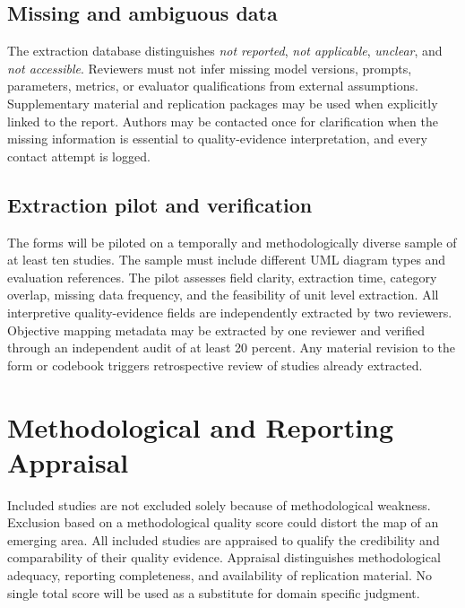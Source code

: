 \subsection{Missing and ambiguous data}

The extraction database distinguishes \textit{not reported}, \textit{not applicable}, \textit{unclear}, and \textit{not accessible}. Reviewers must not infer missing model versions, prompts, parameters, metrics, or evaluator qualifications from external assumptions. Supplementary material and replication packages may be used when explicitly linked to the report. Authors may be contacted once for clarification when the missing information is essential to quality-evidence interpretation, and every contact attempt is logged.

\subsection{Extraction pilot and verification}

The forms will be piloted on a temporally and methodologically diverse sample of at least ten studies. The sample must include different UML diagram types and evaluation references. The pilot assesses field clarity, extraction time, category overlap, missing data frequency, and the feasibility of unit level extraction. All interpretive quality-evidence fields are independently extracted by two reviewers. Objective mapping metadata may be extracted by one reviewer and verified through an independent audit of at least 20 percent. Any material revision to the form or codebook triggers retrospective review of studies already extracted.

\section{Methodological and Reporting Appraisal}
\label{sec:protocol_appraisal}

Included studies are not excluded solely because of methodological weakness. Exclusion based on a methodological quality score could distort the map of an emerging area. All included studies are appraised to qualify the credibility and comparability of their quality evidence. Appraisal distinguishes methodological adequacy, reporting completeness, and availability of replication material. No single total score will be used as a substitute for domain specific judgment.

